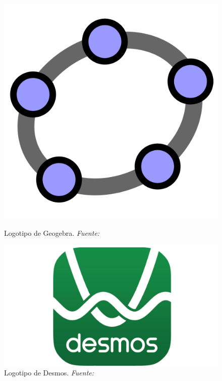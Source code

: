\begin{figure}[H]
	\centering
	\begin{minipage}{0.4\textwidth}
		\centering
		\includegraphics[width=\textwidth]{img/chapter02/logo_geogebra.png}
		\caption[Logotipo de Geogebra.]{Logotipo de Geogebra. \textit{Fuente: ~\cite{wolframMatemathica}}}
		\label{fig:logo-geogebra}
	\end{minipage}%
	\hfill %
	\begin{minipage}{0.6\textwidth}
		\centering
		\includegraphics[width=\textwidth]{img/chapter02/logo_desmos.jpg} %
		\caption[Logotipo de Desmos.]{Logotipo de Desmos. \textit{Fuente: ~\cite{Desmos2024}}}
		\label{fig:logo-desmos}
	\end{minipage}
\end{figure}

